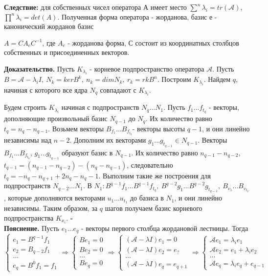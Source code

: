 \textbf{Следствие:} для собственных чисел оператора А имеет место
$\sum\limits^n\lambda_i=tr(\mathcal A)$, $\prod\limits^n\lambda_i=det(A)$.
Полученная форма оператора - жорданова, базис е - канонический жорданов базис\\
\begin{theor}
$A=CA_eC^{-1}$, где $A_e$ - жорданова форма, С состоит из координатных столбцов
собственных и присоединенных векторов.\end{theor}
\textbf{Доказательство.} Пусть $K_{\lambda_i}$ - корневое подпространство
оператора $\mathcal A$. Пусть $B=\mathcal A-\lambda_iI,~N_k=kerB^k,~n_k=dimN_k
,~r_k=rkB^n$. Построим $K_{\lambda_i}$. Найдем $q$, начиная с которого все ядра
$N_q$ совпадают с $K_{\lambda_i}$. 

Будем строить $K_{\lambda_i}$ начиная с подпространств $N_q...N_1$.
Пусть $f_1...f_{t_q}$ - векторы, дополняющие произвольный базис $N_{q-1}$ до
$N_q$. Их количество равно $t_q=n_{q}-n_{q-1}$. Возьмем векторы $B_{f_1}...B
_{f_{t_q}}$- векторы высоты $q-1$, и они линейно независимы над $n-2$. Дополним
их векторами $g_1...g_{t_{q-1}}\in N_{q-1}$. Векторы $B_{f_1}...B_{f_{t_q}}$, 
$g_1...g_{t_{q-1}}$ образуют базис в $N_{q-1}$. Их количество равно $n_{q-1}
-n_{q-2}$, $t_{q-1}=(n_{q-1}-n_{q-2})-(n_q-n_{q-1})$, следовательно $t_q=-n_q
-n_{q+1}+2n_q-n_q-1$. Выполним такие же построения для подпространств $N_{q-2}
...N_1$.
В $N_1\colon B^{q-1}f_1...B^{q-1}f_{t_q},~B^{q-2}g_1...B^{q-2}g_{t_{q-1}},~
B_{v_1}...B_{v_{t_2}}$, которые дополняются векторами $u_1...u_{t_1}$ до базиса
в $N_1$, и они линейно независимы.
Таким образом, за $q$ шагов получаем базис корневого подпространства $K_{x_i}$.
$\square$\\
\textbf{Пояснение.} Пусть $e_1...e_q$ - векторы первого столбца жордановой 
лестницы. Тогда
$$\begin{cases}e_1=B^{q-1}f_1\\e_2=B_{q-2}f_1\\\dots\\e_q=B^0f_1=f_1\end{cases}
\Rightarrow\begin{cases}Be_1=0\\Be_2=0\\\dots\\Be_q=0\end{cases}\Rightarrow
\begin{cases}(\mathcal A-\lambda I)e_1=0\\(\mathcal A-\lambda I)e_2=e_?\\\dots
		\\(\mathcal A-\lambda I)e_q=e_{q+1}\end{cases}\Rightarrow\begin{cases}
\mathcal Ae_1=\lambda_ie_1\\\mathcal Ae_2=e_1+\lambda_ie_2\\\dots\\\mathcal A
e_q=\lambda_ie_q+e_{q-1}\end{cases}$$
